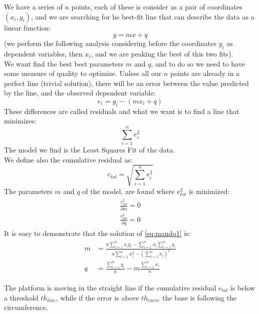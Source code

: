 We have a series of $n$ points, each of these is consider as a pair of coordinates $(x_i,y_i)$, and we are searching for he best-fit line that can describe the data as a linear function:  $$y = mx + q$$ 
(we perform the following analysis considering before the coordinates $y_i$ as dependent variables, then $x_i$, and we are peaking the best of this two fits). \\
We want find the best best parameters $m$ and $q$, and to do so we need to have some measure of quality to optimize. Unless all our $n$ points are already in a perfect line (trivial solution), there will be an error between the value predicted by the line, and the observed dependent variable:
$$e_i = y_i - (mx_i + q)$$
These differences are called residuals and what we want is to find a line that minimizes: 
$$\sum_{i=1}^{n}{e_i^2}$$
The model we find is the Least Squares Fit of the data. \\ %
We define also the cumulative residual as: $$e_{tot} = \sqrt{\sum_{i=1}^{n}{e_i^2}}$$
The parameters $m$ and $q$ of the model, are found where $e_{tot}^2$ is minimized:
\begin{align}
\begin{split}
\frac{e_{tot}^2}{\partial m} = 0\\
\frac{e_{tot}^2}{\partial q} = 0
\end{split}
\label{eq:mandq1}
\end{align}
It is easy to demonstrate that the solution of \ref{eq:mandq1} is:
\begin{align}
\begin{split}
m &= \frac{n\sum_{i=1}^{n}{x_iy_i} - \sum_{i=1}^{n}{x_i}\sum_{i=1}^{n}{y_i}}{n\sum_{i=1}^{n}{x_i^2} -( \sum_{i=1}^{n}{x_i})^2} \\[10pt]
q &= \frac{ \sum_{i=1}^{n}{y_i}}{n} - m\frac{ \sum_{i=1}^{n}{x_i}}{n}
\end{split}
\label{eq:mandq}
\end{align}

The platform is moving in the straight line if the cumulative residual $e_{tot}$ is below a threshold $th_{line}$, while if the error is above $th_{curve}$ the base is following the circumference.\\

